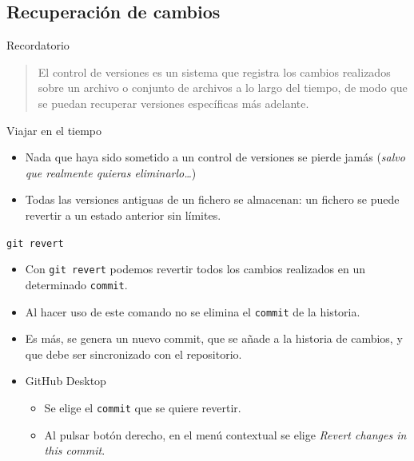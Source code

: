 \documentclass[aspectratio=169, xcolor={usenames,svgnames,dvipsnames}]{beamer}
\begin{document}
\subsection{Recuperación de cambios}
\label{sec:orgbc3010c}
\begin{frame}[label={sec:org952e323}]{Recordatorio}
\begin{quote}
El control de versiones es un sistema que \alert{registra los cambios}
realizados sobre un archivo o conjunto de archivos a lo largo del
tiempo, de modo que se puedan \alert{recuperar} versiones específicas más
adelante.
\end{quote}
\begin{block}{Viajar en el tiempo}
\begin{itemize}
\item Nada que haya sido sometido a un control de versiones se pierde jamás (\emph{salvo que realmente quieras eliminarlo\ldots{}})
\item \alert{Todas} las versiones antiguas de un fichero se almacenan: un fichero se puede revertir a un estado anterior sin límites.
\end{itemize}
\end{block}
\end{frame}
\begin{frame}[label={sec:orga54d4e3},fragile]{\texttt{git revert}}
 \begin{itemize}
\item Con \texttt{git revert} podemos revertir \alert{todos} los cambios realizados en un determinado \texttt{commit}.
\item Al hacer uso de este comando no se elimina el \texttt{commit} de la historia.
\item Es más, se genera un \alert{nuevo commit}, que se añade a la historia de cambios, y que debe ser sincronizado con el repositorio.
\item \alert{GitHub Desktop}
\begin{itemize}
\item Se elige el \texttt{commit} que se quiere revertir.
\item Al pulsar botón derecho, en el menú contextual se elige \emph{Revert changes in this commit}.
\end{itemize}
\end{itemize}
\end{frame}
\end{document}
